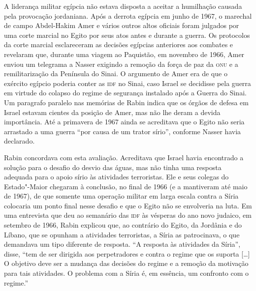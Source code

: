 A liderança militar egípcia não estava disposta a aceitar a humilhação
causada pela provocação jordaniana. Após a derrota egípcia em junho de
1967, o marechal de campo Abdel-Hakim Amer e vários outros altos
oficiais foram julgados por uma corte marcial no Egito por seus atos
antes e durante a guerra. Os protocolos da corte marcial esclareceram as
decisões egípcias anteriores aos combates e revelaram que, durante uma
viagem ao Paquistão, em novembro de 1966, Amer enviou um telegrama a
Nasser exigindo a remoção da força de paz da \textsc{onu} e a remilitarização da
Península do Sinai. O argumento de Amer era de que o exército egípcio
poderia conter as \textsc{idf} no Sinai, caso Israel se decidisse pela guerra em
virtude do colapso do regime de segurança instalado após a Guerra do
Sinai. Um paragrafo paralelo nas memórias de Rabin indica que os órgãos
de defesa em Israel estavam cientes da posição de Amer, mas não lhe
deram a devida importância. Até a primavera de 1967 ainda se acreditava
que o Egito não seria arrastado a uma guerra ``por causa de um trator
sírio'', conforme Nasser havia declarado.

Rabin concordava com esta avaliação. Acreditava que Israel havia
encontrado a solução para o desafio do desvio das águas, mas não tinha
uma resposta adequada para o apoio sírio às atividades terroristas. Ele
e seus colegas do Estado"-Maior chegaram à conclusão, no final de 1966 (e
a mantiveram até maio de 1967), de que somente uma operação militar em larga
escala contra a Síria colocaria um ponto final nesse desafio e que o
Egito não se envolveria na luta. Em uma entrevista que deu ao semanário
das \textsc{idf} às vésperas do ano novo judaico, em setembro de 1966, Rabin
explicou que, ao contrário do Egito, da Jordânia e do Líbano, que se
opunham a atividades terroristas, a Síria as patrocinava, o que
demandava um tipo diferente de resposta. ``A resposta às atividades da
Síria'', disse, ``tem de ser dirigida aos perpetradores e contra o
regime que os suporta {[}\ldots{}{]} O objetivo deve ser a mudança das decisões do
regime e a remoção da motivação para tais atividades. O problema com a
Síria é, em essência, um confronto com o regime.''


